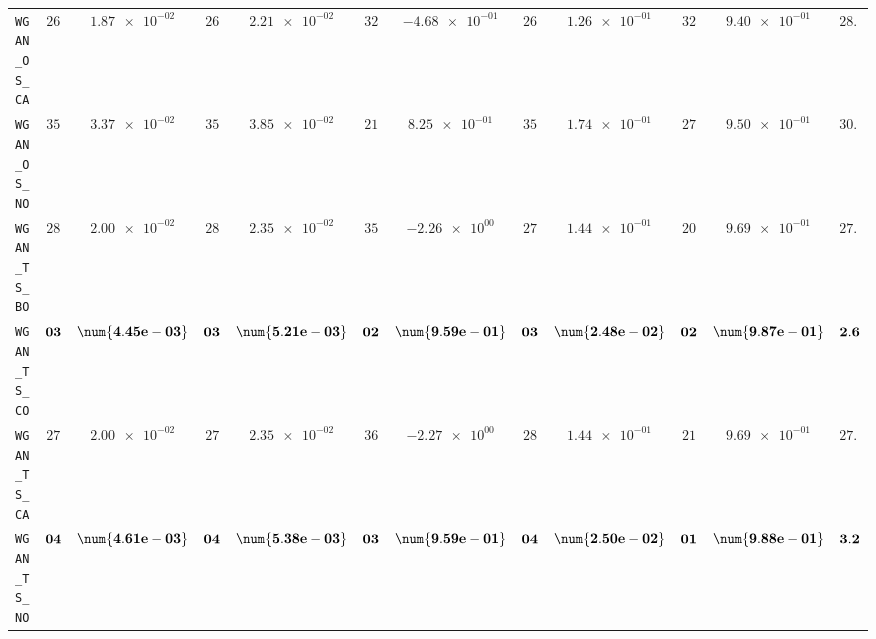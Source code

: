 \begin{table}[H]
\begin{tabularx}{\textwidth}{l||cC|cC|cC|cC|cC||c}
		\texttt{WGAN\_OS\_CA} & $ 26$ & $ \num{1.87e-02}$ & $ 26$ & $ \num{2.21e-02}$ & $ 32$ & $ \num{-4.68e-01}$ & $ 26$ & $ \num{1.26e-01}$ & $ 32$ & $ \num{9.40e-01}$ & $ 28.4$  \\
		\texttt{WGAN\_OS\_NO} & $ 35$ & $ \num{3.37e-02}$ & $ 35$ & $ \num{3.85e-02}$ & $ 21$ & $ \num{8.25e-01}$ & $ 35$ & $ \num{1.74e-01}$ & $ 27$ & $ \num{9.50e-01}$ & $ 30.6$  \\
		\texttt{WGAN\_TS\_BO} & $ 28$ & $ \num{2.00e-02}$ & $ 28$ & $ \num{2.35e-02}$ & $ 35$ & $ \num{-2.26e+00}$ & $ 27$ & $ \num{1.44e-01}$ & $ 20$ & $ \num{9.69e-01}$ & $ 27.6$  \\
		\texttt{WGAN\_TS\_CO} & $\bf 03$ & $\bf \num{4.45e-03}$ & $\bf 03$ & $\bf \num{5.21e-03}$ & $\bf 02$ & $\bf \num{9.59e-01}$ & $\bf 03$ & $\bf \num{2.48e-02}$ & $\bf 02$ & $\bf \num{9.87e-01}$ & $\bf 2.6$  \\
		\texttt{WGAN\_TS\_CA} & $ 27$ & $ \num{2.00e-02}$ & $ 27$ & $ \num{2.35e-02}$ & $ 36$ & $ \num{-2.27e+00}$ & $ 28$ & $ \num{1.44e-01}$ & $ 21$ & $ \num{9.69e-01}$ & $ 27.8$  \\
		\texttt{WGAN\_TS\_NO} & $\bf 04$ & $\bf \num{4.61e-03}$ & $\bf 04$ & $\bf \num{5.38e-03}$ & $\bf 03$ & $\bf \num{9.59e-01}$ & $\bf 04$ & $\bf \num{2.50e-02}$ & $\bf 01$ & $\bf \num{9.88e-01}$ & $\bf 3.2$  \\ \hline

\end{tabularx}
\end{table}
